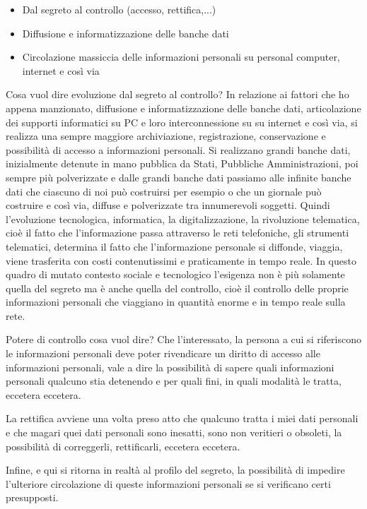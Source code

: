 \begin{itemize}
    \item Dal segreto al controllo (accesso, rettifica,...)
    \item Diffusione e informatizzazione delle banche dati
    \item Circolazione massiccia delle informazioni personali su personal computer, internet e così via
\end{itemize}

Cosa vuol dire evoluzione dal segreto al controllo? In relazione ai fattori che ho appena manzionato, diffusione e informatizzazione delle banche dati, articolazione dei supporti informatici su PC e loro interconnessione su su internet e così via, si realizza una sempre maggiore archiviazione, registrazione, conservazione e possibilità di accesso a informazioni personali. 
Si realizzano grandi banche dati, inizialmente detenute in mano pubblica da Stati, Pubbliche Amministrazioni, poi sempre più polverizzate e dalle grandi banche dati passiamo alle infinite banche dati che ciascuno di noi può costruirsi per esempio o che un giornale può costruire e così via, diffuse e polverizzate tra innumerevoli soggetti. 
Quindi l'evoluzione tecnologica, informatica, la digitalizzazione, la rivoluzione telematica, cioè il fatto che l'informazione passa attraverso le reti telefoniche, gli strumenti telematici, determina il fatto che l'informazione personale si diffonde, viaggia, viene trasferita con costi contenutissimi e praticamente in tempo reale. In questo quadro di mutato contesto sociale e tecnologico l'esigenza non è più solamente quella del segreto ma è anche quella del controllo, cioè il controllo delle proprie informazioni personali che viaggiano in quantità enorme e in tempo reale sulla rete. 

Potere di controllo cosa vuol dire? Che l'interessato, la persona a cui si riferiscono le informazioni personali deve poter rivendicare un diritto di accesso alle informazioni personali, vale a dire la possibilità di sapere quali informazioni personali qualcuno stia detenendo e per quali fini, in quali modalità le tratta, eccetera eccetera. 

La rettifica avviene una volta preso atto che qualcuno tratta i miei dati personali e che magari quei dati personali sono inesatti, sono non veritieri o obsoleti, la possibilità di correggerli, rettificarli, eccetera eccetera. 

Infine, e qui si ritorna in realtà al profilo del segreto, la possibilità di impedire l'ulteriore circolazione di queste informazioni personali se si verificano certi presupposti. 

